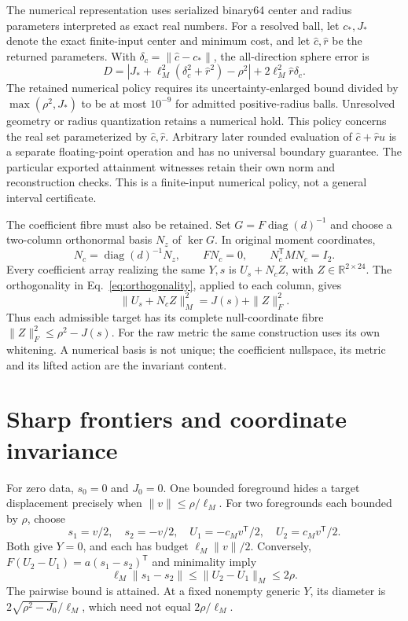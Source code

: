 \documentclass[aps,prd,onecolumn,11pt,nofootinbib,notitlepage]{revtex4-2}
\newcommand{\R}{\mathbb R}
\begin{document}
The numerical representation uses serialized binary64 center and radius parameters interpreted as exact real numbers. For a resolved ball, let $c_*,J_*$ denote the exact finite-input center and minimum cost, and let $\widehat c,\widehat r$ be the returned parameters. With $\delta_c=\|\widehat c-c_*\|$, the all-direction sphere error is
\begin{equation}
 D=\left|J_*+\ell_M^2(\delta_c^2+\widehat r^2)-\rho^2\right|
       +2\ell_M^2\widehat r\delta_c.
\end{equation}
The retained numerical policy requires its uncertainty-enlarged bound divided by $\max(\rho^2,J_*)$ to be at most $10^{-9}$ for admitted positive-radius balls. Unresolved geometry or radius quantization retains a numerical hold. This policy concerns the real set parameterized by $\widehat c,\widehat r$. Arbitrary later rounded evaluation of $\widehat c+\widehat r u$ is a separate floating-point operation and has no universal boundary guarantee. The particular exported attainment witnesses retain their own norm and reconstruction checks. This is a finite-input numerical policy, not a general interval certificate.

The coefficient fibre must also be retained. Set $G=F\operatorname{diag}(d)^{-1}$ and choose a two-column orthonormal basis $N_z$ of $\ker G$. In original moment coordinates,
\begin{equation}
 N_c=\operatorname{diag}(d)^{-1}N_z,\qquad FN_c=0,\qquad N_c^{\mathsf T}MN_c=I_2.
 \label{eq:null}
\end{equation}
Every coefficient array realizing the same $Y,s$ is $U_s+N_cZ$, with $Z\in\R^{2\times24}$. The orthogonality in Eq.~\eqref{eq:orthogonality}, applied to each column, gives
\begin{equation}
 \|U_s+N_cZ\|_M^2=J(s)+\|Z\|_F^2.
 \label{eq:fibre}
\end{equation}
Thus each admissible target has its complete null-coordinate fibre $\|Z\|_F^2\le\rho^2-J(s)$. For the raw metric the same construction uses its own whitening. A numerical basis is not unique; the coefficient nullspace, its metric and its lifted action are the invariant content.

\section{Sharp frontiers and coordinate invariance}

For zero data, $s_0=0$ and $J_0=0$. One bounded foreground hides a target displacement precisely when $\|v\|\le\rho/\ell_M$. For two foregrounds each bounded by $\rho$, choose
\begin{equation}
 s_1=v/2,\quad s_2=-v/2,\quad
 U_1=-c_Mv^{\mathsf T}/2,\quad U_2=c_Mv^{\mathsf T}/2.
\end{equation}
Both give $Y=0$, and each has budget $\ell_M\|v\|/2$. Conversely, $F(U_2-U_1)=a(s_1-s_2)^{\mathsf T}$ and minimality imply
\begin{equation}
 \ell_M\|s_1-s_2\|\le\|U_2-U_1\|_M\le2\rho.
\end{equation}
The pairwise bound is attained. At a fixed nonempty generic $Y$, its diameter is $2\sqrt{\rho^2-J_0}/\ell_M$, which need not equal $2\rho/\ell_M$.
\end{document}
